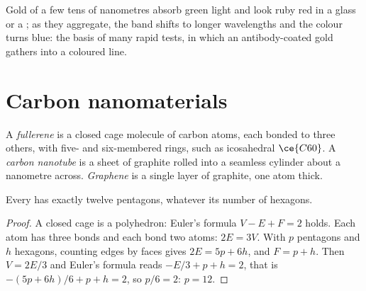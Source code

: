 Gold  of a few tens of nanometres absorb green light and look
ruby red in a glass or a ; as they aggregate, the band shifts to longer
wavelengths and the colour turns blue: the basis of many rapid tests, in which
an antibody-coated gold  gathers into a coloured line.

\section{Carbon nanomaterials}

\begin{definition}\label{def:b3:inorganic-materials:carbon}
A \emph{fullerene} is a closed cage molecule of carbon atoms,
each bonded to three others, with five- and six-membered rings, such as
icosahedral $\ce{C60}$. A \emph{carbon nanotube} is a sheet of
graphite rolled into a seamless cylinder about a nanometre across.
\emph{Graphene} is a single layer of graphite, one atom thick.
\end{definition}

\begin{proposition}\label{prop:b3:inorganic-materials:euler}
Every  has exactly twelve pentagons, whatever its number of
hexagons.
\end{proposition}

\begin{proof}
A closed cage is a polyhedron: Euler's formula $V - E + F = 2$ holds. Each atom has
three bonds and each bond two atoms: $2E = 3V$. With $p$ pentagons and $h$ hexagons,
counting edges by faces gives $2E = 5p + 6h$, and $F = p + h$. Then $V = 2E/3$ and Euler's
formula reads $-E/3 + p + h = 2$, that is $-(5p + 6h)/6 + p + h = 2$, so $p/6 = 2$: $p = 12$.
\end{proof}

